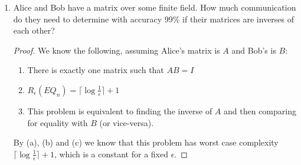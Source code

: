 \documentclass[usletter]{article}
\begin{document}
\begin{enumerate}
\begin{proof}
      \begin{enumerate}
        \item Both $A$ and $B$ can be represented as their basis which contains $m$ (which is order $n$) linearly independent vectors of order $n$ bits ($O(n^2)$).
        \item $A$ and $B$ are orthogonal if $\forall x \in A, y \in B. \langle x, y \rangle = 0$, from \cite{orthsub}
        \item $N(\mathsf{IP_n}) = O(n)$
      \end{enumerate}

      By (a), (b) and (c) we know that $O(n^2)$ bits is sufficient to check the orthogonality of the subspaces because we can run the inner product protocol $n$ times, once for each vector in $A$ or $B$.

      Further, we can't do any better than the $n$ nondeterministic bits required for each inner product so if we were to reduce the required communication it would have to be by sending fewer vectors from our basis, e.g. $\log^c m$ vectors. Assume, that we can verify the orthogonality of $A$ and $B$ by sending fewer than $m$ vectors, this implies that there is some number of $m'$ that forms a basis for $A$ or $B$, but this contradicts our assumption that we were making use of the basis initially. So $O(n^2)$ is also necessary.
    \end{proof}

  \item Alice and Bob have a matrix over some finite field. How much communication do they need to determine with accuracy 99\% if their matrices are inverses of each other?

    \begin{proof}
      We know the following, assuming Alice's matrix is $A$ and Bob's is $B$:

      \begin{enumerate}
        \item There is exactly one matrix such that $AB = I$
        \item $R_{\epsilon}(EQ_n) = \lceil \log \frac{1}{\epsilon} \rceil + 1$
        \item This problem is equivalent to finding the inverse of $A$ and then comparing for equality with $B$ (or vice-versa).
      \end{enumerate}

      By (a), (b) and (c) we know that this problem has worst case complexity $\lceil \log \frac{1}{\epsilon} \rceil + 1$, which is a constant for a fixed $\epsilon$.
    \end{proof}
\end{enumerate}

\newpage



\end{document}
